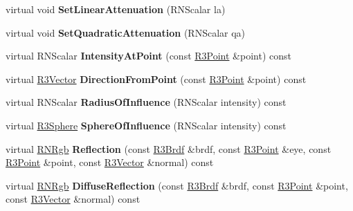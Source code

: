 \begin{DoxyCompactItemize}
\item 
virtual void {\bfseries Set\+Linear\+Attenuation} (R\+N\+Scalar la)\hypertarget{class_r3_point_light_ac6f28901991aadd32b56224734de5835}{}\label{class_r3_point_light_ac6f28901991aadd32b56224734de5835}

\item 
virtual void {\bfseries Set\+Quadratic\+Attenuation} (R\+N\+Scalar qa)\hypertarget{class_r3_point_light_a826edcfc0b868922de4921feee592629}{}\label{class_r3_point_light_a826edcfc0b868922de4921feee592629}

\item 
virtual R\+N\+Scalar {\bfseries Intensity\+At\+Point} (const \hyperlink{class_r3_point}{R3\+Point} \&point) const \hypertarget{class_r3_point_light_a6192631ce7d497e7bb9f47ff94d32279}{}\label{class_r3_point_light_a6192631ce7d497e7bb9f47ff94d32279}

\item 
virtual \hyperlink{class_r3_vector}{R3\+Vector} {\bfseries Direction\+From\+Point} (const \hyperlink{class_r3_point}{R3\+Point} \&point) const \hypertarget{class_r3_point_light_a3d6a7dd4d1ff4e3d3907fd267808d4bf}{}\label{class_r3_point_light_a3d6a7dd4d1ff4e3d3907fd267808d4bf}

\item 
virtual R\+N\+Scalar {\bfseries Radius\+Of\+Influence} (R\+N\+Scalar intensity) const \hypertarget{class_r3_point_light_a77f111accced801ce2f3ce09c0f8f3b3}{}\label{class_r3_point_light_a77f111accced801ce2f3ce09c0f8f3b3}

\item 
virtual \hyperlink{class_r3_sphere}{R3\+Sphere} {\bfseries Sphere\+Of\+Influence} (R\+N\+Scalar intensity) const \hypertarget{class_r3_point_light_a3a317c0744ebd5409c1a5215a733ef21}{}\label{class_r3_point_light_a3a317c0744ebd5409c1a5215a733ef21}

\item 
virtual \hyperlink{class_r_n_rgb}{R\+N\+Rgb} {\bfseries Reflection} (const \hyperlink{class_r3_brdf}{R3\+Brdf} \&brdf, const \hyperlink{class_r3_point}{R3\+Point} \&eye, const \hyperlink{class_r3_point}{R3\+Point} \&point, const \hyperlink{class_r3_vector}{R3\+Vector} \&normal) const \hypertarget{class_r3_point_light_a0f90f489b782654f053214f8fc410ac7}{}\label{class_r3_point_light_a0f90f489b782654f053214f8fc410ac7}

\item 
virtual \hyperlink{class_r_n_rgb}{R\+N\+Rgb} {\bfseries Diffuse\+Reflection} (const \hyperlink{class_r3_brdf}{R3\+Brdf} \&brdf, const \hyperlink{class_r3_point}{R3\+Point} \&point, const \hyperlink{class_r3_vector}{R3\+Vector} \&normal) const \hypertarget{class_r3_point_light_a801ded380a187411e60a2cfa1f81e401}{}\label{class_r3_point_light_a801ded380a187411e60a2cfa1f81e401}


\end{DoxyCompactItemize}
